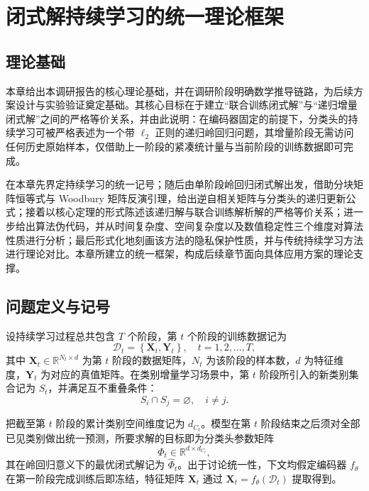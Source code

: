 
\chapter{闭式解持续学习的统一理论框架}

\section{理论基础}

本章给出本调研报告的核心理论基础，并在调研阶段明确数学推导链路，为后续方案设计与实验验证奠定基础。其核心目标在于建立“联合训练闭式解”与“递归增量闭式解”之间的严格等价关系，并由此说明：在编码器固定的前提下，分类头的持续学习可被严格表述为一个带 $\ell_2$ 正则的递归岭回归问题，其增量阶段无需访问任何历史原始样本，仅借助上一阶段的紧凑统计量与当前阶段的训练数据即可完成。

在本章先界定持续学习的统一记号；随后由单阶段岭回归闭式解出发，借助分块矩阵恒等式与 Woodbury 矩阵反演引理，给出逆自相关矩阵与分类头的递归更新公式；接着以核心定理的形式陈述该递归解与联合训练解析解的严格等价关系；进一步给出算法伪代码，并从时间复杂度、空间复杂度以及数值稳定性三个维度对算法性质进行分析；最后形式化地刻画该方法的隐私保护性质，并与传统持续学习方法进行理论对比。本章所建立的统一框架，构成后续章节面向具体应用方案的理论支撑。

\section{问题定义与记号}

设持续学习过程总共包含 $T$ 个阶段，第 $t$ 个阶段的训练数据记为
\begin{equation}
\mathcal{D}_t=\left\{\mathbf{X}_t,\mathbf{Y}_t\right\},\quad t=1,2,\ldots,T,
\label{eq:data_def_report}
\end{equation}
其中 $\mathbf{X}_t \in \mathbb{R}^{N_t\times d}$ 为第 $t$ 阶段的数据矩阵，$N_t$ 为该阶段的样本数，$d$ 为特征维度，$\mathbf{Y}_t$ 为对应的真值矩阵。在类别增量学习场景中，第 $t$ 阶段所引入的新类别集合记为 $S_t$，并满足互不重叠条件：
\begin{equation}
S_i \cap S_j=\varnothing,\quad i\neq j.
\label{eq:disjoint_report}
\end{equation}

把截至第 $t$ 阶段的累计类别空间维度记为 $d_{C_t}$。模型在第 $t$ 阶段结束之后须对全部已见类别做出统一预测，所要求解的目标即为分类头参数矩阵
\begin{equation}
\Phi_t\in\mathbb{R}^{d\times d_{C_t}},
\label{eq:phi_def_report}
\end{equation}
其在岭回归意义下的最优闭式解记为 $\widehat{\Phi}_t$。出于讨论统一性，下文均假定编码器 $f_\theta$ 在第一阶段完成训练后即冻结，特征矩阵 $\mathbf{X}_t$ 通过 $\mathbf{X}_t=f_\theta(\mathcal{D}_t)$ 提取得到。

